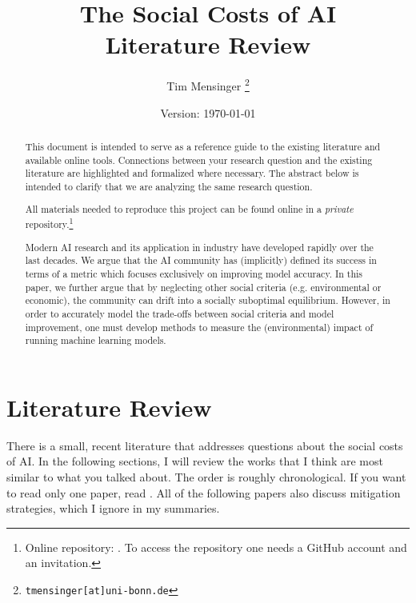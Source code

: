 \documentclass[a4paper, 12pt]{article}
\title{\textbf{The Social Costs of AI}\\
    \Large Literature Review
}
\date{Version: \today}
\author{Tim Mensinger%
  \thanks{\texttt{tmensinger[at]uni-bonn.de}}
}
\affil{Bonn Graduate School of Economics}
\begin{document}
\onehalfspacing


\maketitle

\renewcommand{\abstractname}{Preamble}
\begin{abstract}
    \noindent This document is intended to serve as a reference guide to the existing
    literature and available online tools. Connections between your research question
    and the existing literature are highlighted and formalized where necessary. The
    abstract below is intended to clarify that we are analyzing the same research
    question.

    All materials needed to reproduce this project can be found online in a
    \emph{private} repository.\footnote{Online repository:
    . To access the repository one
    needs a GitHub account and an invitation.}
\end{abstract}

\renewcommand{\abstractname}{Abstract}
\begin{abstract}
    \noindent Modern AI research and its application in industry have developed rapidly
    over the last decades. We argue that the AI community has (implicitly) defined its
    success in terms of a metric which focuses exclusively on improving model accuracy.
    In this paper, we further argue that by neglecting other social criteria (e.g.
    environmental or economic), the community can drift into a socially suboptimal
    equilibrium. However, in order to accurately model the trade-offs between social
    criteria and model improvement, one must develop methods to measure the
    (environmental) impact of running machine learning models.
\end{abstract}
\thispagestyle{empty}

\newpage



\section{Literature Review}

There is a small, recent literature that addresses questions about the social costs of
AI. In the following sections, I will review the works that I think are most similar to
what you talked about. The order is roughly chronological. If you want to read only one
paper, read . All of the following papers also discuss mitigation
strategies, which I ignore in my summaries.
\end{document}

